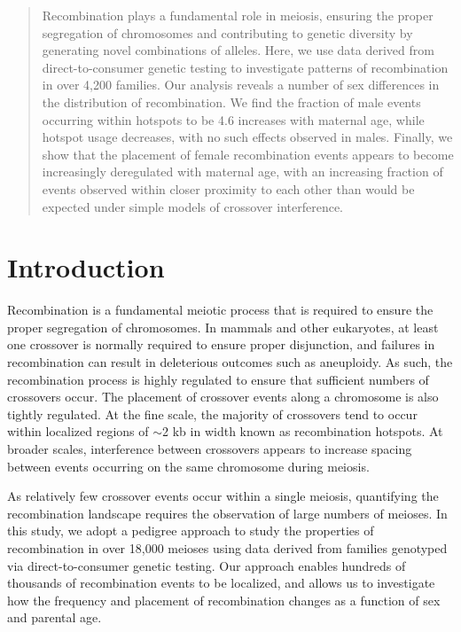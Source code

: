 

\begin{abstract}

Recombination plays a fundamental role in meiosis, ensuring the proper segregation of
chromosomes and contributing to genetic diversity by generating novel combinations of
alleles. Here, we use data derived from direct-to-consumer genetic testing to investigate
patterns of recombination in over 4,200 families. Our analysis reveals a number of sex
differences in the distribution of recombination. We find the fraction of male events occurring
within hotspots to be 4.6%
increases with maternal age, while hotspot usage decreases, with no such effects observed in
males. Finally, we show that the placement of female recombination events appears to
become increasingly deregulated with maternal age, with an increasing fraction of events
observed within closer proximity to each other than would be expected under simple models
of crossover interference.

\end{abstract}


\section{Introduction}

Recombination is a fundamental meiotic process that is
required to ensure the proper segregation of chromosomes.
In mammals and other eukaryotes, at least one crossover is
normally required to ensure proper disjunction, and failures in
recombination can result in deleterious outcomes such as
aneuploidy. As such, the recombination process is highly
regulated to ensure that sufficient numbers of crossovers occur.
The placement of crossover events along a chromosome is also
tightly regulated. At the fine scale, the majority of crossovers tend
to occur within localized regions of $\sim$2 kb in width known as
recombination hotspots. At broader scales, interference between
crossovers appears to increase spacing between events occurring
on the same chromosome during meiosis.

As relatively few crossover events occur within a single meiosis,
quantifying the recombination landscape requires the observation
of large numbers of meioses. In this study, we adopt a pedigree
approach to study the properties of recombination in over 18,000
meioses using data derived from families genotyped via 
direct-to-consumer genetic testing. Our approach enables hundreds of
thousands of recombination events to be localized, and allows us
to investigate how the frequency and placement of recombination
changes as a function of sex and parental age.

